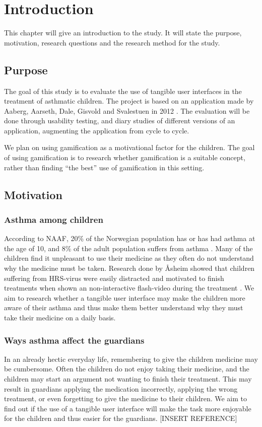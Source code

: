 \chapter{Introduction}
\label{chp:introduction}

This chapter will give an introduction to the study. It will state the purpose, motivation, research questions and the research method for the study. 

\section{Purpose}
\label{sec:purpose}
The goal of this study is to evaluate the use of tangible user interfaces in the treatment of asthmatic children. The project is based on an application made by Aaberg, Aarseth, Dale, Gisvold and Svalestuen in 2012 \cite{CustomerDriven}.
The evaluation will be done through usability testing, and diary studies of different versions of an application, augmenting the application from cycle to cycle. 

We plan on using gamification as a motivational factor for the children. The goal of using gamification is to research whether gamification is a suitable concept, rather than finding ``the best'' use of gamification in this setting.


\section{Motivation}
\label{sec:motivation}

\subsection{Asthma among children}
According to NAAF, 20\% of the Norwegian population has or has had asthma at the age of 10, and 8\% of the adult population suffers from asthma \cite{NAAF}. Many of the children find it unpleasant to use their medicine as they often do not understand why the medicine must be taken. Research done by \r{A}sheim showed that children suffering from HRS-virus were easily distracted and motivated to finish treatments when shown an non-interactive flash-video during the treatment \cite{Asheim610877}. We aim to research whether a tangible user interface may make the children more aware of their asthma and thus make them better understand why they must take their medicine on a daily basis. 


\subsection{Ways asthma affect the guardians}
In an already hectic everyday life, remembering to give the children medicine may be cumbersome. Often the children do not enjoy taking their medicine, and the children may start an argument not wanting to finish their treatment. This may result in guardians applying the medication incorrectly, applying the wrong treatment, or even forgetting to give the medicine to their children. We aim to find out if the use of a tangible user interface will make the task more enjoyable for the children and thus easier for the guardians. [INSERT REFERENCE]


